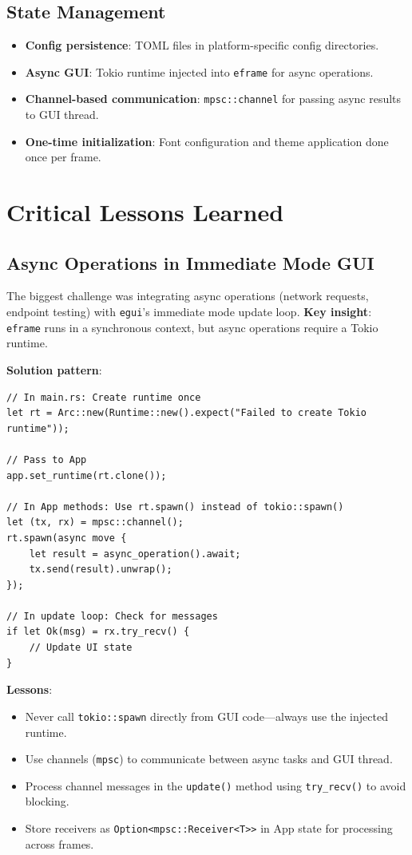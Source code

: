 \subsection{State Management}
\begin{itemize}
    \item \textbf{Config persistence}: TOML files in platform-specific config directories.
    \item \textbf{Async GUI}: Tokio runtime injected into \texttt{eframe} for async operations.
    \item \textbf{Channel-based communication}: \texttt{mpsc::channel} for passing async results to GUI thread.
    \item \textbf{One-time initialization}: Font configuration and theme application done once per frame.
\end{itemize}

\section{Critical Lessons Learned}

\subsection{Async Operations in Immediate Mode GUI}

The biggest challenge was integrating async operations (network requests, endpoint testing) with \texttt{egui}'s immediate mode update loop. \textbf{Key insight}: \texttt{eframe} runs in a synchronous context, but async operations require a Tokio runtime.

\textbf{Solution pattern}:
\begin{verbatim}
// In main.rs: Create runtime once
let rt = Arc::new(Runtime::new().expect("Failed to create Tokio runtime"));

// Pass to App
app.set_runtime(rt.clone());

// In App methods: Use rt.spawn() instead of tokio::spawn()
let (tx, rx) = mpsc::channel();
rt.spawn(async move {
    let result = async_operation().await;
    tx.send(result).unwrap();
});

// In update loop: Check for messages
if let Ok(msg) = rx.try_recv() {
    // Update UI state
}
\end{verbatim}

\textbf{Lessons}:
\begin{itemize}
    \item Never call \texttt{tokio::spawn} directly from GUI code—always use the injected runtime.
    \item Use channels (\texttt{mpsc}) to communicate between async tasks and GUI thread.
    \item Process channel messages in the \texttt{update()} method using \texttt{try\_recv()} to avoid blocking.
    \item Store receivers as \texttt{Option<mpsc::Receiver<T>>} in App state for processing across frames.
\end{itemize}

